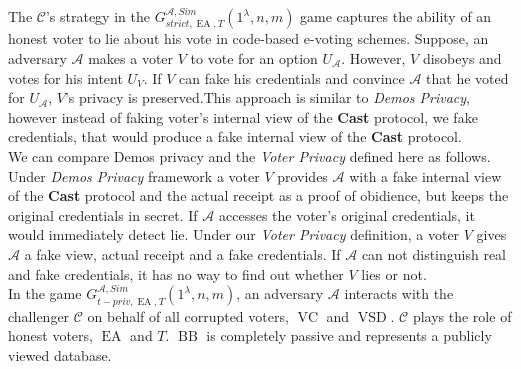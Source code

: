 \documentclass[12pt]{article}
\DeclareMathOperator{\vsd}{VSD}
\DeclareMathOperator{\ea}{EA}
\DeclareMathOperator{\bb}{BB}
\DeclareMathOperator{\voc}{VC}
\begin{document}
The $\mathcal{C}$'s strategy  in the  $G_{strict,\ea,T}^{\mathcal{A}, Sim}(1^{\lambda},n,m)$ game captures the ability of an honest voter to lie about his vote in code-based e-voting schemes. Suppose, an adversary $\mathcal{A}$ makes a voter $V$ to vote for an option $U_{\mathcal{A}}$.  However, $V$ disobeys and votes for his intent $U_{V}$. If $V$ can fake his credentials  and convince $\mathcal{A}$ that he voted for $U_{\mathcal{A}}$, $V$'s privacy is preserved.This approach is similar to \textit{Demos Privacy}, however instead of faking voter's internal view of the \textbf{Cast} protocol, we fake credentials, that would produce a fake internal view of the \textbf{Cast} protocol.\\

We can compare Demos privacy and the \textit{Voter Privacy} defined here as follows. Under \textit{Demos Privacy} framework a voter $V$ provides $\mathcal{A}$  with a fake internal view of the \textbf{Cast} protocol and the actual receipt as a proof of obidience, but keeps the original credentials in secret. If $\mathcal{A}$ accesses the voter's original credentials, it would immediately detect lie. Under our \textit{Voter Privacy} definition, a voter $V$ gives $\mathcal{A}$ a fake view, actual receipt and a fake credentials. If $\mathcal{A}$ can not distinguish real and fake credentials, it has no way to find out whether $V$ lies or not. \\
 
In the game $G_{t-priv,\ea,T}^{\mathcal{A}, Sim}(1^{\lambda},n,m)$, an adversary $\mathcal{A}$ interacts with the challenger $\mathcal{C}$ on behalf of all corrupted voters, $\voc$ and $\vsd$. $\mathcal{C}$ plays the role of honest voters, $\ea$ and $T$. $\bb$ is completely passive and represents a publicly viewed database. \\\\
\end{document}

